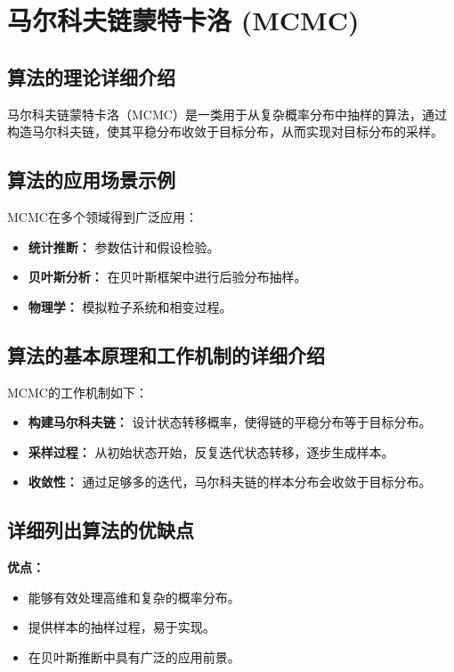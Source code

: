 \section{马尔科夫链蒙特卡洛 (MCMC)}
\subsection*{算法的理论详细介绍}
马尔科夫链蒙特卡洛（MCMC）是一类用于从复杂概率分布中抽样的算法，通过构造马尔科夫链，使其平稳分布收敛于目标分布，从而实现对目标分布的采样。

\subsection*{算法的应用场景示例}
MCMC在多个领域得到广泛应用：
\begin{itemize}
    \item \textbf{统计推断：} 参数估计和假设检验。
    \item \textbf{贝叶斯分析：} 在贝叶斯框架中进行后验分布抽样。
    \item \textbf{物理学：} 模拟粒子系统和相变过程。
\end{itemize}

\subsection*{算法的基本原理和工作机制的详细介绍}
MCMC的工作机制如下：
\begin{itemize}
    \item \textbf{构建马尔科夫链：} 设计状态转移概率，使得链的平稳分布等于目标分布。
    \item \textbf{采样过程：} 从初始状态开始，反复迭代状态转移，逐步生成样本。
    \item \textbf{收敛性：} 通过足够多的迭代，马尔科夫链的样本分布会收敛于目标分布。
\end{itemize}

\subsection*{详细列出算法的优缺点}
\textbf{优点：}
\begin{itemize}
    \item 能够有效处理高维和复杂的概率分布。
    \item 提供样本的抽样过程，易于实现。
    \item 在贝叶斯推断中具有广泛的应用前景。
\end{itemize}


